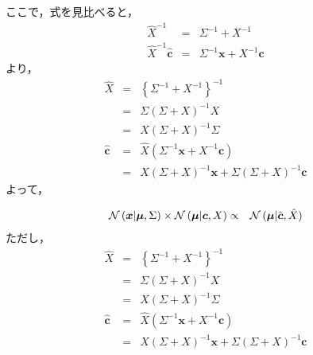 \documentclass[a4j]{jarticle}
\begin{document}
ここで，式を見比べると，
\begin{eqnarray}
\hat{X}^{-1} &=& \Sigma^{-1} + X^{-1}\\
\hat{X}^{-1}\hat{\boldsymbol{c}} &=& \Sigma^{-1}\boldsymbol{x} + X^{-1}\boldsymbol{c}
\end{eqnarray}
より，
\begin{eqnarray}
\hat{X} &=& \left\{ \Sigma^{-1} + X^{-1} \right\}^{-1}\\
&=& \Sigma \left(\Sigma + X\right)^{-1} X\\
&=&X \left(\Sigma + X\right)^{-1} \Sigma\\
\hat{\boldsymbol{c}} &=& \hat{X}\left(\Sigma^{-1}\boldsymbol{x} + X^{-1}\boldsymbol{c} \right)\\
&=& X\left( \Sigma + X \right)^{-1}\boldsymbol{x} + \Sigma\left( \Sigma + X \right)^{-1}\boldsymbol{c}
\end{eqnarray}
よって，
\begin{screen}
\begin{eqnarray}
\operatorname{\mathcal{N}}{(\boldsymbol{x} | \boldsymbol{\mu}, \Sigma)}
\times
\operatorname{\mathcal{N}}{(\boldsymbol{\mu} | \boldsymbol{c}, X)}
&\propto&
\operatorname{\mathcal{N}}{(\boldsymbol{\mu} | \hat{\boldsymbol{c}}, \hat{X})}
\end{eqnarray}
ただし，
\begin{eqnarray}
\hat{X} &=& \left\{ \Sigma^{-1} + X^{-1} \right\}^{-1}\\
&=& \Sigma \left(\Sigma + X\right)^{-1} X\\
&=&X \left(\Sigma + X\right)^{-1} \Sigma\\
\hat{\boldsymbol{c}} &=& \hat{X}\left(\Sigma^{-1}\boldsymbol{x} + X^{-1}\boldsymbol{c} \right)\\
&=& X\left( \Sigma + X \right)^{-1}\boldsymbol{x} + \Sigma\left( \Sigma + X \right)^{-1}\boldsymbol{c}
\end{eqnarray}
\end{screen}
\end{document}
